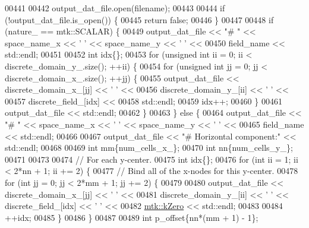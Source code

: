 \begin{DoxyCode}
00441 
00442   output\_dat\_file.open(filename);
00443 
00444   \textcolor{keywordflow}{if} (!output\_dat\_file.is\_open()) \{
00445     \textcolor{keywordflow}{return} \textcolor{keyword}{false};
00446   \}
00447 
00448   \textcolor{keywordflow}{if} (nature\_ == mtk::SCALAR) \{
00449     output\_dat\_file << \textcolor{stringliteral}{"# "} << space\_name\_x <<  \textcolor{charliteral}{' '} << space\_name\_y << \textcolor{charliteral}{' '} <<
00450       field\_name << std::endl;
00451 
00452     \textcolor{keywordtype}{int} idx\{\};
00453     \textcolor{keywordflow}{for} (\textcolor{keywordtype}{unsigned} \textcolor{keywordtype}{int} ii = 0; ii < discrete\_domain\_y\_.size(); ++ii) \{
00454       \textcolor{keywordflow}{for} (\textcolor{keywordtype}{unsigned} \textcolor{keywordtype}{int} jj = 0; jj < discrete\_domain\_x\_.size(); ++jj) \{
00455         output\_dat\_file << discrete\_domain\_x\_[jj] << \textcolor{charliteral}{' '} <<
00456                            discrete\_domain\_y\_[ii] << \textcolor{charliteral}{' '} <<
00457                            discrete\_field\_[idx] <<
00458                           std::endl;
00459         idx++;
00460       \}
00461       output\_dat\_file << std::endl;
00462     \}
00463   \} \textcolor{keywordflow}{else} \{
00464     output\_dat\_file << \textcolor{stringliteral}{"# "} << space\_name\_x <<  \textcolor{charliteral}{' '} << space\_name\_y << \textcolor{charliteral}{' '} <<
00465       field\_name << std::endl;
00466 
00467     output\_dat\_file << \textcolor{stringliteral}{"# Horizontal component:"} << std::endl;
00468 
00469     \textcolor{keywordtype}{int} mm\{num\_cells\_x\_\};
00470     \textcolor{keywordtype}{int} nn\{num\_cells\_y\_\};
00471 
00473 
00474     \textcolor{comment}{// For each y-center.}
00475     \textcolor{keywordtype}{int} idx\{\};
00476     \textcolor{keywordflow}{for} (\textcolor{keywordtype}{int} ii = 1; ii < 2*nn + 1; ii += 2) \{
00477       \textcolor{comment}{// Bind all of the x-nodes for this y-center.}
00478       \textcolor{keywordflow}{for} (\textcolor{keywordtype}{int} jj = 0; jj < 2*mm + 1; jj += 2) \{
00479 
00480         output\_dat\_file << discrete\_domain\_x\_[jj] << \textcolor{charliteral}{' '} <<
00481           discrete\_domain\_y\_[ii] << \textcolor{charliteral}{' '} << discrete\_field\_[idx] << \textcolor{charliteral}{' '} <<
00482           \hyperlink{group__c01-roots_ga59a451a5fae30d59649bcda274fea271}{mtk::kZero} << std::endl;
00483 
00484         ++idx;
00485       \}
00486     \}
00487 
00489     \textcolor{keywordtype}{int} p\_offset\{nn*(mm + 1) - 1\};

\end{DoxyCode}

